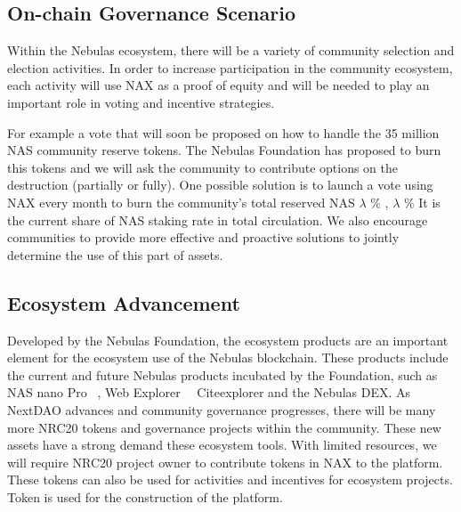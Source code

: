 \subsection{On-chain Governance Scenario}
Within the Nebulas ecosystem, there will be a variety of community selection and election activities. In order to increase participation in the community ecosystem, each activity will use NAX as a proof of equity and will be needed to play an important role in voting and incentive strategies.

For example a vote that will soon be proposed on how to handle the 35 million NAS community reserve tokens. The Nebulas Foundation has proposed to burn this tokens and we will ask the community to contribute options on the destruction (partially or fully). One possible solution is to launch a vote using NAX every month to burn the community's total reserved NAS \(\lambda\) \% , \(\lambda\) \% It is the current share of NAS staking rate in total circulation. We also encourage communities to provide more effective and proactive solutions to jointly determine the use of this part of assets.


\subsection{Ecosystem Advancement}
Developed by the Nebulas Foundation, the ecosystem products are an important element for the ecosystem use of the Nebulas blockchain. These products include the current and future Nebulas products incubated by the Foundation, such as NAS nano Pro ~\cite{NASnano}, Web Explorer ~\ Cite{explorer} and the Nebulas DEX. As NextDAO advances and community governance progresses, there will be many more NRC20 tokens and governance projects within the community. These new assets have a strong demand these ecosystem tools. With limited resources, we will require NRC20 project owner to contribute tokens in NAX to the platform. These tokens can also be used for activities and incentives for ecosystem projects. Token is used for the construction of the platform.
